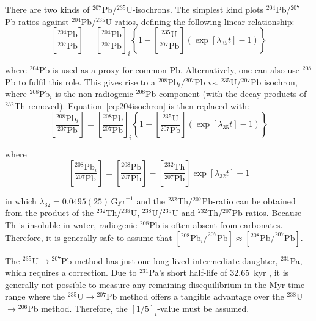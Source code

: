 \documentclass{article}
\begin{document}
There are two kinds of ${}^{207}$Pb/${}^{235}$U-isochrons. The
simplest kind plots ${}^{204}$Pb/${}^{207}$Pb-ratios against
${}^{204}$Pb/${}^{235}$U-ratios, defining the following linear
relationship:
\begin{equation}
  \left[\frac{{}^{204}\mbox{Pb}}{{}^{207}\mbox{Pb}}\right] =
  \left[\frac{{}^{204}\mbox{Pb}}{{}^{207}\mbox{Pb}}\right]_i \left\{ 1
  - \left[\frac{{}^{235}\mbox{U}}{{}^{207}\mbox{Pb}}\right](\exp[\lambda_{35}t]-1) \right\}
  \label{eq:204isochron}
\end{equation}

\noindent where ${}^{204}$Pb is used as a proxy for common
Pb. Alternatively, one can also use ${}^{208}$Pb to fulfil this
role. This gives rise to a ${}^{208}$Pb$_i/{}^{207}$Pb
vs. ${}^{235}$U/${}^{207}$Pb isochron, where ${}^{208}$Pb$_i$ is the
non-radiogenic ${}^{208}$Pb-component (with the decay products of
${}^{232}$Th removed). Equation~\ref{eq:204isochron} is then replaced
with:
\begin{equation}
  \left[\frac{{}^{208}\mbox{Pb}_i}{{}^{207}\mbox{Pb}}\right] =
  \left[\frac{{}^{208}\mbox{Pb}}{{}^{207}\mbox{Pb}}\right]_i \left\{ 1 -
  \left[\frac{{}^{235}\mbox{U}}{{}^{207}\mbox{Pb}}\right](\exp[\lambda_{35}t]-1) \right\}
  \label{eq:208isochron}
\end{equation}

\noindent where
\begin{equation}
  \left[\frac{{}^{208}\mbox{Pb}_i}{{}^{207}\mbox{Pb}}\right] =
  \left[\frac{{}^{208}\mbox{Pb}}{{}^{207}\mbox{Pb}}\right] -
  \left[\frac{{}^{232}\mbox{Th}}{{}^{207}\mbox{Pb}}\right] \exp[\lambda_{32}t] + 1
\end{equation}

\noindent in which $\lambda_{32}=0.0495(25)\,\mbox{Gyr}^{-1}$
\citep{leroux1963} and the ${}^{232}$Th/${}^{207}$Pb-ratio can be
obtained from the product of the ${}^{232}$Th/${}^{238}$U,
${}^{238}$U/${}^{235}$U and ${}^{232}$Th/${}^{207}$Pb ratios. Because
Th is insoluble in water, radiogenic ${}^{208}$Pb is often absent from
carbonates. Therefore, it is generally safe to assume that
$\left[{}^{208}\mbox{Pb}_i/^{207}\mbox{Pb}\right] \approx
\left[{}^{208}\mbox{Pb}/^{207}\mbox{Pb}\right]$.\medskip

The ${}^{235}$U$\rightarrow{}^{207}$Pb method has just one long-lived
intermediate daughter, ${}^{231}$Pa, which requires a correction. Due
to ${}^{231}$Pa's short half-life of 32.65~kyr
\citep[$\lambda_{31}=21.158(71)\,\mbox{Myr}^{-1}$;][]{audi2003}, it is
generally not possible to measure any remaining disequilibrium in the
Myr time range where the ${}^{235}$U$\rightarrow{}^{207}$Pb method
offers a tangible advantage over the
${}^{238}$U$\rightarrow{}^{206}$Pb method. Therefore, the
$[1/5]_i$-value must be assumed.\medskip
\end{document}

